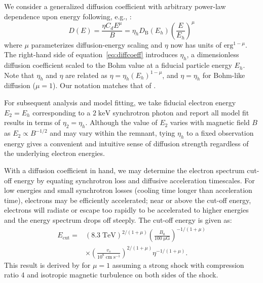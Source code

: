 \documentclass[iop, apj, numberedappendix]{emulateapj}
\newcommand*{\mt}{\mathrm}
\newcommand*{\unit}[1]{\;\mt{#1}}  %
\newcommand*{\Ecut}{E_{\mt{cut}}}
\newcommand*{\muG}{\unit{\mu G}}
\begin{document}
We consider a generalized diffusion coefficient with arbitrary
power-law dependence upon energy following, e.g., \citet{parizot2006}:
\begin{equation} \label{eq:diffcoeff}
    D(E) = \frac{\eta C_d E^\mu}{B}
         = \eta_h D_{\mt{B}}\left(E_h\right) \left(\frac{E}{E_h}\right)^\mu
\end{equation}
where $\mu$ parameterizes diffusion-energy scaling and $\eta$ now has units
of $\mt{erg}^{1-\mu}$.  The right-hand side of equation~\eqref{eq:diffcoeff}
introduces $\eta_h$, a dimensionless diffusion coefficient scaled to the Bohm
value at a fiducial particle energy $E_h$.  Note that $\eta_h$ and $\eta$ are
related as $\eta = \eta_h (E_h)^{1-\mu}$, and $\eta = \eta_h$ for Bohm-like
diffusion ($\mu = 1$).  Our notation matches that of .

For subsequent analysis and model fitting, we take fiducial electron energy
$E_2 = E_h$ corresponding to a $2 \unit{keV}$ synchrotron photon and report all
model fit results in terms of $\eta_2 = \eta_h$.  Although the value of $E_2$
varies with magnetic field $B$ as $E_2 \propto B^{-1/2}$ and may vary within
the remnant, tying $\eta_h$ to a fixed observation energy gives a convenient
and intuitive sense of diffusion strength regardless of the underlying electron
energies.

With a diffusion coefficient in hand, we may determine the electron spectrum
cut-off energy by equating synchrotron loss and diffusive acceleration
timescales.  For low energies and small synchrotron losses (cooling time longer
than acceleration time), electrons may be efficiently accelerated; near or
above the cut-off energy, electrons will radiate or escape too rapidly to be
accelerated to higher energies and the energy spectrum drops off steeply.  The
cut-off energy is given as:
\begin{align} \label{eq:ecut}
    \Ecut =
        &\left(8.3\unit{TeV}\right)^{2/(1+\mu)}
        \left(\frac{B_0}{100 \muG}\right)^{-1/(1+\mu)} \nonumber \\
        &\times \left(\frac{v_s}{10^8 \unit{cm\;s^{-1}}}\right)^{2/(1+\mu)}
        \eta^{-1 / (1+\mu)} .
\end{align}
This result is derived by \citet{parizot2006} for $\mu=1$ assuming a strong
shock with compression ratio 4 and isotropic magnetic turbulence on both sides
of the shock.
\end{document}
